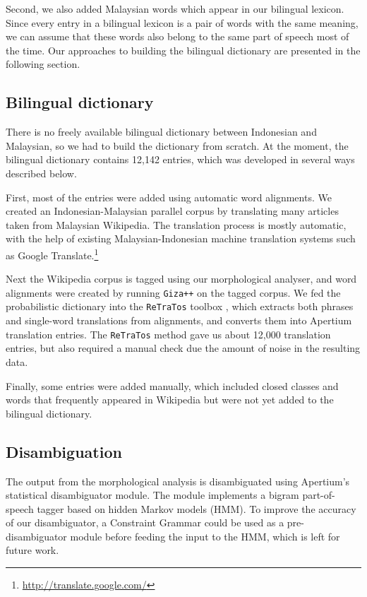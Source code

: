 \documentclass[10pt,a5paper,twoside]{article}
\begin{document}
Second, we also added Malaysian words which appear in our bilingual lexicon. Since every entry in a bilingual lexicon is a pair of words with the same meaning, we can assume that these words also belong to the same part of speech most of the time. Our approaches to building the bilingual dictionary are presented in the following section.

\subsection{Bilingual dictionary}
There is no freely available bilingual dictionary between Indonesian and Malaysian, so we had to build the dictionary from scratch. At the moment, the bilingual dictionary contains 12,142 entries, which was developed in several ways described below.

First, most of the entries were added using automatic word alignments. We created an Indonesian-Malaysian parallel corpus by translating many articles taken from Malaysian Wikipedia. The translation process is mostly automatic, with the help of existing Malaysian-Indonesian machine translation systems such as Google Translate.\footnote{\url{http://translate.google.com/}}

Next the Wikipedia corpus is tagged using our morphological analyser, and word alignments were created by running \texttt{Giza++} \citep{Och2003align} on the tagged corpus. We fed the probabilistic dictionary into the \texttt{ReTraTos} toolbox \citep{Caseli2006retratos}, which extracts both phrases and single-word translations from alignments, and converts them into Apertium translation entries. The \texttt{ReTraTos} method gave us about 12,000 translation entries, but also required a manual check due the amount of noise in the resulting data.

Finally, some entries were added manually, which included closed classes and words that frequently appeared in Wikipedia but were not yet added to the bilingual dictionary.

\subsection{Disambiguation}
The output from the morphological analysis is disambiguated using Apertium's statistical disambiguator module. The module implements a bigram part-of-speech tagger based on hidden Markov models (HMM). To improve the accuracy of our disambiguator, a Constraint Grammar \citep{Karlsson1990cg} could be used as a pre-disambiguator module before feeding the input to the HMM, which is left for future work.
\end{document}

